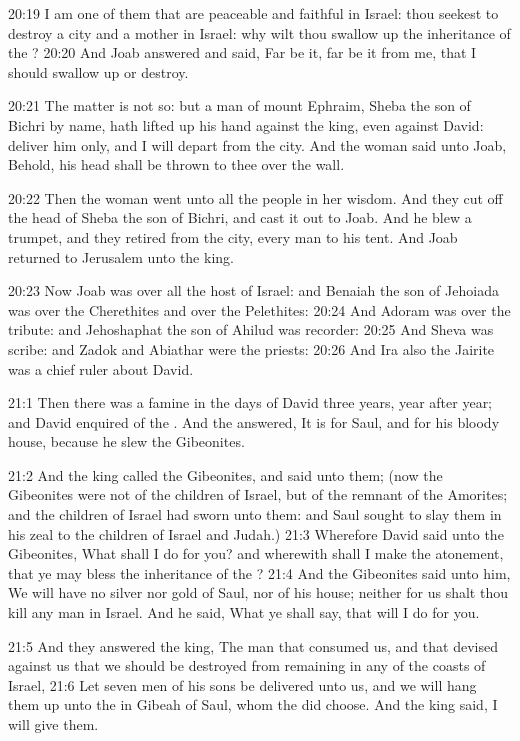 20:19 I am one of them that are peaceable and faithful in Israel: thou
seekest to destroy a city and a mother in Israel: why wilt thou
swallow up the inheritance of the \LORD?  20:20 And Joab answered and
said, Far be it, far be it from me, that I should swallow up or
destroy.

20:21 The matter is not so: but a man of mount Ephraim, Sheba the son
of Bichri by name, hath lifted up his hand against the king, even
against David: deliver him only, and I will depart from the city. And
the woman said unto Joab, Behold, his head shall be thrown to thee
over the wall.

20:22 Then the woman went unto all the people in her wisdom. And they
cut off the head of Sheba the son of Bichri, and cast it out to Joab.
And he blew a trumpet, and they retired from the city, every man to
his tent. And Joab returned to Jerusalem unto the king.

20:23 Now Joab was over all the host of Israel: and Benaiah the son of
Jehoiada was over the Cherethites and over the Pelethites: 20:24 And
Adoram was over the tribute: and Jehoshaphat the son of Ahilud was
recorder: 20:25 And Sheva was scribe: and Zadok and Abiathar were the
priests: 20:26 And Ira also the Jairite was a chief ruler about David.

21:1 Then there was a famine in the days of David three years, year
after year; and David enquired of the \LORD. And the \LORD answered, It
is for Saul, and for his bloody house, because he slew the Gibeonites.

21:2 And the king called the Gibeonites, and said unto them; (now the
Gibeonites were not of the children of Israel, but of the remnant of
the Amorites; and the children of Israel had sworn unto them: and Saul
sought to slay them in his zeal to the children of Israel and Judah.)
21:3 Wherefore David said unto the Gibeonites, What shall I do for
you?  and wherewith shall I make the atonement, that ye may bless the
inheritance of the \LORD?  21:4 And the Gibeonites said unto him, We
will have no silver nor gold of Saul, nor of his house; neither for us
shalt thou kill any man in Israel. And he said, What ye shall say,
that will I do for you.

21:5 And they answered the king, The man that consumed us, and that
devised against us that we should be destroyed from remaining in any
of the coasts of Israel, 21:6 Let seven men of his sons be delivered
unto us, and we will hang them up unto the \LORD in Gibeah of Saul,
whom the \LORD did choose. And the king said, I will give them.


